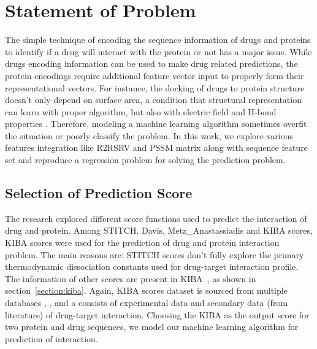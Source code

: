 \iffalse

For citations, use the function \textbackslash cite. \citep{gowar1989power} The references file is the sample.bib one. Google Scholar provides almost all the references in LaTeX form.

To insert a footnote, use the following command. \footnote{This is a footnote.} When necessary to use a nomenclature, define it on the same page for a better organization. Don't create NSN (Non-sense nomenclatures).

For figures, tables, equations and further information, open the file "tips.tex". If what you need is not found there, Google it.

\fi
 
\section{Statement of Problem}
The simple technique of encoding the sequence information of drugs and proteins to identify if a drug will interact with the protein or not has a major issue. While drugs encoding information can be used to make drug related predictions, the protein encodings require additional feature vector input to properly form their representational vectors. For instance, the docking of drugs to protein structure doesn't only depend on surface area, a condition that structural representation can learn with proper algorithm, but also with electric field and H-bond properties \citep{Wong2018}. Therefore, modeling a machine learning algorithm sometimes overfit the situation or poorly classify the problem. In this work, we explore various features integration like R2RSRV and PSSM matrix along with sequence feature set and reproduce a regression problem for solving the prediction problem.

\subsection{Selection of Prediction Score}

The research explored different score functions used to predict the interaction of drug and protein. Among STITCH, Davis, Metz\_Anastassiadis and KIBA scores, KIBA scores were used for the prediction of drug and protein interaction problem. The main reasons are: STITCH scores don't fully explore the primary thermodynamic dissociation constants used for drug-target interaction profile. The information of other scores are present in KIBA~\citep{Tang2013}, as shown in section~\ref{section:kiba}. Again, KIBA scores dataset is sourced from multiple databases \citep{Kanehisa2000}, \citep{Wishart2018}, \citep{Hecker2012} and \citep{Sharma2010} a consists of experimental data and secondary data (from literature) of drug-target interaction. Choosing the KIBA as the output score for two protein and drug sequences, we model our machine learning algorithm for prediction of interaction.

